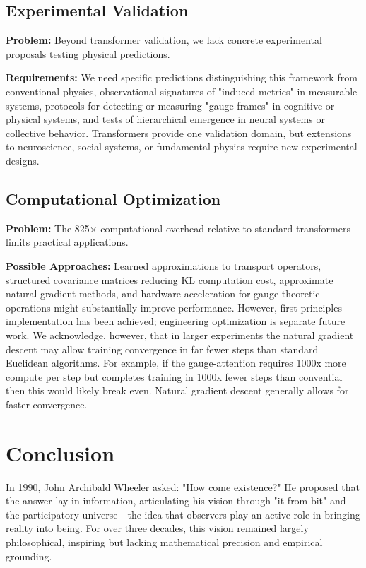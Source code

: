 \documentclass[11pt]{article}
\begin{document}
\subsection{Experimental Validation}

\textbf{Problem:} Beyond transformer validation, we lack concrete experimental proposals testing physical predictions.

\textbf{Requirements:} We need specific predictions distinguishing this framework from conventional physics, observational signatures of "induced metrics" in measurable systems, protocols for detecting or measuring "gauge frames" in cognitive or physical systems, and tests of hierarchical emergence in neural systems or collective behavior. Transformers provide one validation domain, but extensions to neuroscience, social systems, or fundamental physics require new experimental designs.

\subsection{Computational Optimization}

\textbf{Problem:} The 825× computational overhead relative to standard transformers limits practical applications.

\textbf{Possible Approaches:} Learned approximations to transport operators, structured covariance matrices reducing KL computation cost, approximate natural gradient methods, and hardware acceleration for gauge-theoretic operations might substantially improve performance. However, first-principles implementation has been achieved; engineering optimization is separate future work. We acknowledge, however, that in larger experiments the natural gradient descent may allow training convergence in far fewer steps than standard Euclidean algorithms.  For example, if the gauge-attention requires 1000x more compute per step but completes training in 1000x fewer steps than convential then this would likely break even.  Natural gradient descent generally allows for faster convergence.

\section{Conclusion}
\label{sec:conclusion}

In 1990, John Archibald Wheeler asked: "How come existence?" He proposed that the answer lay in information, articulating his vision through "it from bit" and the participatory universe - the idea that observers play an active role in bringing reality into being. For over three decades, this vision remained largely philosophical, inspiring but lacking mathematical precision and empirical grounding.
\end{document}
